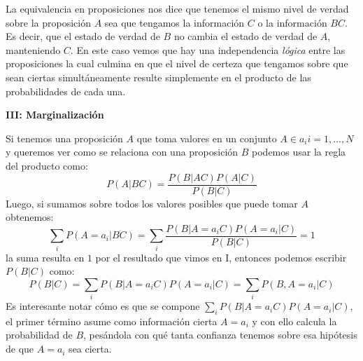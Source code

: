 \documentclass[aps,onecolumn,12pt,notitlepage]{revtex4-1}
\begin{document}
La equivalencia en proposiciones nos dice que tenemos el mismo nivel de verdad sobre la proposición $A$ sea que tengamos la información $C$ o la información $BC$. Es decir, que el estado de verdad de $B$ no cambia el estado de verdad de $A$, manteniendo $C$. En este caso vemos que hay una independencia \textit{lógica} entre las proposiciones la cual culmina en que el nivel de certeza que tengamos sobre que sean ciertas simultáneamente resulte simplemente en el producto de las probabilidades de cada una.


\textbf{III: Marginalización}

Si tenemos una proposición $A$ que toma valores en un conjunto $A \in {a_{i}} i=1,...,N$ y queremos ver como se relaciona con una proposición $B$ podemos usar la regla del producto como:
\begin{equation}
P(A|BC) = \frac{P(B|AC)P(A|C)}{P(B|C)}
\end{equation}
Luego, si sumamos sobre todos los valores posibles que puede tomar $A$ obtenemos:
\begin{equation}
\sum_{i}P(A=a_{i}|BC) = \sum_{i}\frac{P(B|A = a_{i}C)P(A = a_{i}|C)}{P(B|C)} = 1
\end{equation}
la suma resulta en $1$ por el resultado que vimos en I, entonces podemos escribir $P(B|C)$ como:
\begin{equation}
P(B|C) = \sum_{i}P(B|A = a_{i}C)P(A=a_{i}|C) = \sum_{i}P(B,A=a_{i}|C)
\end{equation}
Es interesante notar cómo es que se compone $\sum_{i}P(B|A = a_{i}C)P(A=a_{i}|C)$, el primer término asume como información cierta $A = a_{i}$ y con ello calcula la probabilidad de $B$, pesándola con qué tanta confianza tenemos sobre esa hipótesis de que $A=a_{i}$ sea cierta.
\end{document}
